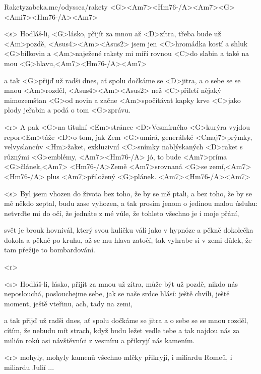 \begin{song}{25}{Rakety}{zabeka.me/odyssea/rakety}
<G><Am7><Hm76-/A><Am7><G><Ami7><Hm76-/A><Am7>

<s> Hodláš-li, <G>lásko, přijít za mnou až <D>zítra, 
třeba bude už <Am>pozdě, <Asus4><Am><Asus2>
jsem jen <C>hromádka kostí a shluk <G>bílkovin 
a <Am>naježené rakety mi míří rovnou <C>do slabin 
a také na mou <G>hlavu,<Am7><Hm76-/A><Am7>

a tak <G>přijď už radši dnes, ať spolu dočkáme se <D>jitra,
a o sebe se se mnou <Am>rozděl, <Asus4><Am><Asus2>
než <C>přiletí nějaký mimozemšťan <G>od novin 
a začne <Am>spočítávat kapky krve <C>jako plody jeřabin 
a podá o tom <G>zprávu. 

<r> A pak <G>na titulní <Em>stránce <D>Vesmírného <G>kurýra 
vyjdou repor<Em>táže <D>o tom, jak Zem <G>umírá, 
generálské <Cmaj7>prýmky, velvyslancův <Hm>žaket,
exkluzivní <C>snímky nablýskaných <D>raket 
s různými <G>emblémy, <Am7><Hm76-/A> jó, to bude <Am7>príma <G>článek,<Am7>
<Hm76-/A>Země <Am7>srovnaná <G>se zemí,<Am7><Hm76-/A> plus <Am7>přiložený <G>plánek.
<Am7><Hm76-/A><Am7>

<s> Byl jsem vhozen do života bez toho, že by se mě ptali, 
a bez toho, že by se mě někdo zeptal, budu zase vyhozen, 
a tak prosím jenom o jedinou malou úsluhu:
netvrďte mi do očí, že jednáte z mé vůle, 
že tohleto všechno je i moje přání,

svět je brouk hovnivál, který svou kuličku válí 
jako v hypnóze 
a pěkně dokolečka dokola a pěkně po kruhu, 
až se mu hlava zatočí, tak vyhrabe si v zemi důlek,
že tam přežije to bombardování. 

<r> 

<s> Hodláš-li, lásko, přijít za mnou už zítra, 
může být už pozdě, 
nikdo nás neposlouchá, poslouchejme sebe, 
jak se naše srdce hlásí: ještě chvíli, ještě moment, 
ještě vteřinu, ach, tady na zemi,

a tak přijď už radši dnes, ať spolu dočkáme se jitra 
a o sebe se se mnou rozděl,
cítím, že nebudu mít strach, když budu ležet vedle tebe 
a tak najdou nás za milión roků asi návštěvníci z vesmíru 
a přikryjí nás kamením. 

<r>
mohyly, mohyly kamenů všechno mlčky přikryjí,
i miliardu Romeů, i miliardu Julií ... 


\end{song}
